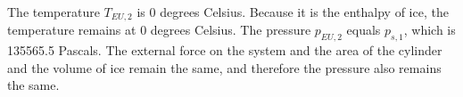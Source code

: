 The temperature \( T_{EU,2} \) is 0 degrees Celsius. Because it is the enthalpy of ice, the temperature remains at 0 degrees Celsius. The pressure \( p_{EU,2} \) equals \( p_{s,1} \), which is 135565.5 Pascals. The external force on the system and the area of the cylinder and the volume of ice remain the same, and therefore the pressure also remains the same.